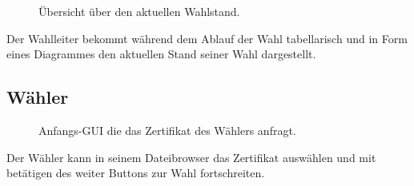 \documentclass[parskip=full,11pt,twoside]{scrartcl}
\begin{document}
\begin{figure}[H]
	\caption{\label{fig:wlltr-status}
		Übersicht über den aktuellen Wahlstand.
	}
\end{figure}
Der Wahlleiter bekommt während dem Ablauf der Wahl tabellarisch und in Form eines Diagrammes den aktuellen Stand seiner Wahl dargestellt.


\subsection{Wähler}

\begin{figure}[H]
	\caption{\label{fig:whlr-start}
		Anfangs-GUI die das Zertifikat des Wählers anfragt.
	}
\end{figure}
Der Wähler kann in seinem Dateibrowser das Zertifikat auswählen und mit betätigen des weiter Buttons zur Wahl fortschreiten.
\end{document}
